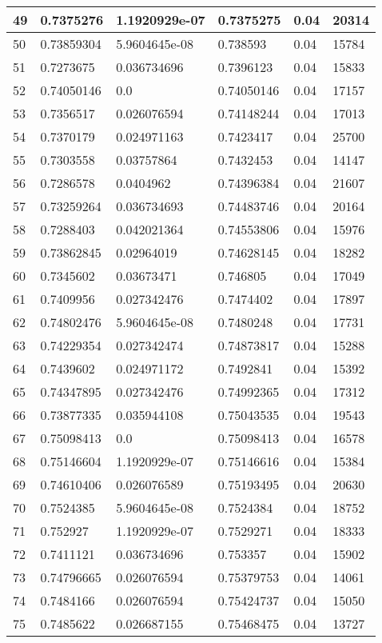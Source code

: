 \begin{longtable}{|l|l|l|l|l|l|}
49 & 0.7375276 & 1.1920929e-07 & 0.7375275 & 0.04 & 20314 \\ \hline 
50 & 0.73859304 & 5.9604645e-08 & 0.738593 & 0.04 & 15784 \\ \hline 
51 & 0.7273675 & 0.036734696 & 0.7396123 & 0.04 & 15833 \\ \hline 
52 & 0.74050146 & 0.0 & 0.74050146 & 0.04 & 17157 \\ \hline 
53 & 0.7356517 & 0.026076594 & 0.74148244 & 0.04 & 17013 \\ \hline 
54 & 0.7370179 & 0.024971163 & 0.7423417 & 0.04 & 25700 \\ \hline 
55 & 0.7303558 & 0.03757864 & 0.7432453 & 0.04 & 14147 \\ \hline 
56 & 0.7286578 & 0.0404962 & 0.74396384 & 0.04 & 21607 \\ \hline 
57 & 0.73259264 & 0.036734693 & 0.74483746 & 0.04 & 20164 \\ \hline 
58 & 0.7288403 & 0.042021364 & 0.74553806 & 0.04 & 15976 \\ \hline 
59 & 0.73862845 & 0.02964019 & 0.74628145 & 0.04 & 18282 \\ \hline 
60 & 0.7345602 & 0.03673471 & 0.746805 & 0.04 & 17049 \\ \hline 
61 & 0.7409956 & 0.027342476 & 0.7474402 & 0.04 & 17897 \\ \hline 
62 & 0.74802476 & 5.9604645e-08 & 0.7480248 & 0.04 & 17731 \\ \hline 
63 & 0.74229354 & 0.027342474 & 0.74873817 & 0.04 & 15288 \\ \hline 
64 & 0.7439602 & 0.024971172 & 0.7492841 & 0.04 & 15392 \\ \hline 
65 & 0.74347895 & 0.027342476 & 0.74992365 & 0.04 & 17312 \\ \hline 
66 & 0.73877335 & 0.035944108 & 0.75043535 & 0.04 & 19543 \\ \hline 
67 & 0.75098413 & 0.0 & 0.75098413 & 0.04 & 16578 \\ \hline 
68 & 0.75146604 & 1.1920929e-07 & 0.75146616 & 0.04 & 15384 \\ \hline 
69 & 0.74610406 & 0.026076589 & 0.75193495 & 0.04 & 20630 \\ \hline 
70 & 0.7524385 & 5.9604645e-08 & 0.7524384 & 0.04 & 18752 \\ \hline 
71 & 0.752927 & 1.1920929e-07 & 0.7529271 & 0.04 & 18333 \\ \hline 
72 & 0.7411121 & 0.036734696 & 0.753357 & 0.04 & 15902 \\ \hline 
73 & 0.74796665 & 0.026076594 & 0.75379753 & 0.04 & 14061 \\ \hline 
74 & 0.7484166 & 0.026076594 & 0.75424737 & 0.04 & 15050 \\ \hline 
75 & 0.7485622 & 0.026687155 & 0.75468475 & 0.04 & 13727 \\ \hline 
\end{longtable}